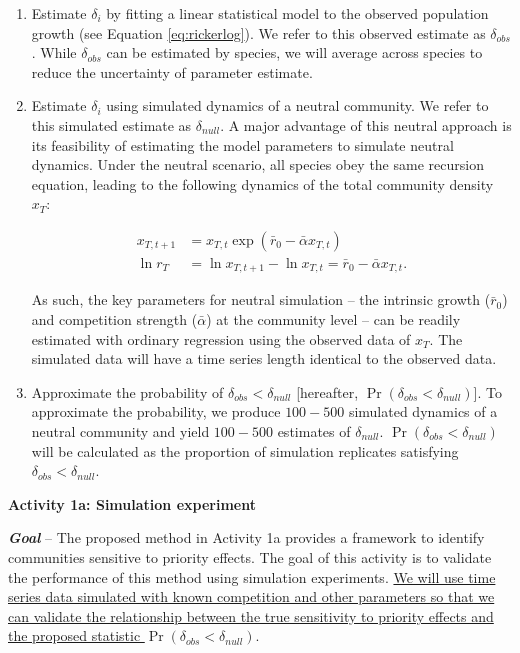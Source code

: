 \documentclass[12pt, class=article, crop=false]{standalone}
\begin{document}
\begin{enumerate}
    \item Estimate $\delta_i$ by fitting a linear statistical model to the observed population growth (see Equation \ref{eq:rickerlog}). We refer to this observed estimate as $\delta_{obs}$. While $\delta_{obs}$ can be estimated by species, we will average across species to reduce the uncertainty of parameter estimate.
    
    \item Estimate $\delta_i$ using simulated dynamics of a neutral community.
    We refer to this simulated estimate as $\delta_{null}$.
    A major advantage of this neutral approach is its feasibility of estimating the model parameters to simulate neutral dynamics. 
    Under the neutral scenario, all species obey the same recursion equation, leading to the following dynamics of the total community density $x_T$:

    \begin{align}
        \label{}
        x_{T, t+1} &= x_{T, t} \exp(\bar{r}_0 - \bar{\alpha} x_{T, t})\\
        \ln r_T &= \ln {x_{T, t+1}} - \ln {x_{T, t}} = \bar{r}_0 - \bar{\alpha} x_{T, t}.
    \end{align}

    As such, the key parameters for neutral simulation -- the intrinsic growth ($\bar{r}_0$) and competition strength ($\bar{\alpha}$) at the community level -- can be readily estimated with ordinary regression using the observed data of $x_T$.
    The simulated data will have a time series length identical to the observed data. 
    
    \item Approximate the probability of $\delta_{obs} < \delta_{null}$ [hereafter, $\Pr(\delta_{obs} < \delta_{null})$]. To approximate the probability, we produce $100 - 500$ simulated dynamics of a neutral community and yield $100 - 500$ estimates of $\delta_{null}$. $\Pr(\delta_{obs} < \delta_{null})$ will be calculated as the proportion of simulation replicates satisfying $\delta_{obs} < \delta_{null}$.
\end{enumerate}

\textbf{Activity 1a: Simulation experiment}

\textbf{\textit{Goal}} -- 
The proposed method in Activity 1a provides a framework to identify communities sensitive to priority effects. The goal of this activity is to validate the performance of this method using simulation experiments.
\ul{We will use time series data simulated with known competition and other parameters so that we can validate the relationship between the true sensitivity to priority effects and the proposed statistic $\Pr(\delta_{obs} < \delta_{null})$}.
\end{document}
